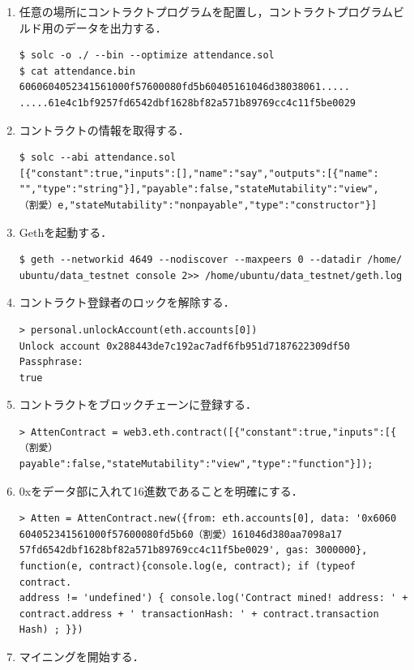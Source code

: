 \begin{enumerate}
\item 任意の場所にコントラクトプログラムを配置し，コントラクトプログラムビルド用のデータを出力する．
\begin{verbatim}
$ solc -o ./ --bin --optimize attendance.sol
$ cat attendance.bin
6060604052341561000f57600080fd5b60405161046d38038061.....
.....61e4c1bf9257fd6542dbf1628bf82a571b89769cc4c11f5be0029
\end{verbatim}
\item コントラクトの情報を取得する．
\begin{verbatim}
$ solc --abi attendance.sol
[{"constant":true,"inputs":[],"name":"say","outputs":[{"name":
"","type":"string"}],"payable":false,"stateMutability":"view",
（割愛）e,"stateMutability":"nonpayable","type":"constructor"}]
\end{verbatim}
\item Gethを起動する．
\begin{verbatim}
$ geth --networkid 4649 --nodiscover --maxpeers 0 --datadir /home/
ubuntu/data_testnet console 2>> /home/ubuntu/data_testnet/geth.log
\end{verbatim}
\newpage
\item コントラクト登録者のロックを解除する．
\begin{verbatim}
> personal.unlockAccount(eth.accounts[0])
Unlock account 0x288443de7c192ac7adf6fb951d7187622309df50
Passphrase:
true
\end{verbatim}
\item コントラクトをブロックチェーンに登録する．
\begin{verbatim}
> AttenContract = web3.eth.contract([{"constant":true,"inputs":[{
（割愛）payable":false,"stateMutability":"view","type":"function"}]);
\end{verbatim}
\item 0xをデータ部に入れて16進数であることを明確にする．
\begin{verbatim}
> Atten = AttenContract.new({from: eth.accounts[0], data: '0x6060
604052341561000f57600080fd5b60（割愛）161046d380aa7098a17
57fd6542dbf1628bf82a571b89769cc4c11f5be0029', gas: 3000000}, 
function(e, contract){console.log(e, contract); if (typeof contract.
address != 'undefined') { console.log('Contract mined! address: ' + 
contract.address + ' transactionHash: ' + contract.transaction
Hash) ; }})
\end{verbatim}
\item マイニングを開始する．
\begin{verbatim}

\end{verbatim}
\end{enumerate}
